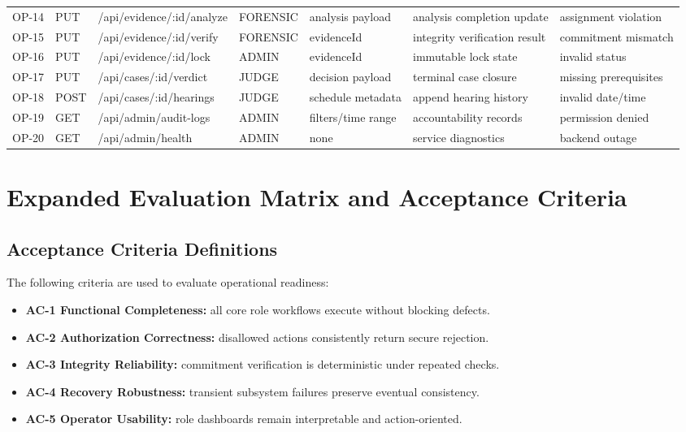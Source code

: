 \documentclass[conference]{IEEEtran}
\begin{document}
\begin{table}[!t]
\begin{tabular}{p{0.75cm} p{1.8cm} p{2.15cm} p{1.25cm} p{2.1cm} p{2.8cm} p{2.4cm}}
OP-14 & PUT & /api/evidence/:id/analyze & FORENSIC & analysis payload & analysis completion update & assignment violation \\
OP-15 & PUT & /api/evidence/:id/verify & FORENSIC & evidenceId & integrity verification result & commitment mismatch \\
OP-16 & PUT & /api/evidence/:id/lock & ADMIN & evidenceId & immutable lock state & invalid status \\
OP-17 & PUT & /api/cases/:id/verdict & JUDGE & decision payload & terminal case closure & missing prerequisites \\
OP-18 & POST & /api/cases/:id/hearings & JUDGE & schedule metadata & append hearing history & invalid date/time \\
OP-19 & GET & /api/admin/audit-logs & ADMIN & filters/time range & accountability records & permission denied \\
OP-20 & GET & /api/admin/health & ADMIN & none & service diagnostics & backend outage \\
\hline
\end{tabular}
\end{table}

\section{Expanded Evaluation Matrix and Acceptance Criteria}
\subsection{Acceptance Criteria Definitions}
The following criteria are used to evaluate operational readiness:
\begin{itemize}
    \item \textbf{AC-1 Functional Completeness:} all core role workflows execute without blocking defects.
    \item \textbf{AC-2 Authorization Correctness:} disallowed actions consistently return secure rejection.
    \item \textbf{AC-3 Integrity Reliability:} commitment verification is deterministic under repeated checks.
    \item \textbf{AC-4 Recovery Robustness:} transient subsystem failures preserve eventual consistency.
    \item \textbf{AC-5 Operator Usability:} role dashboards remain interpretable and action-oriented.
\end{itemize}
\end{document}

